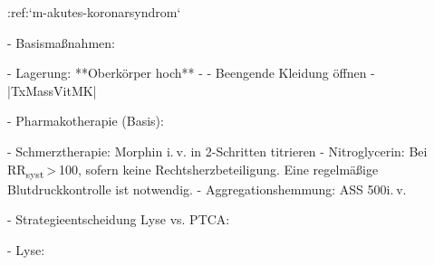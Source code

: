 
:ref:`m-akutes-koronarsyndrom`


\begin{itemize}
  -   Basismaßnahmen:
  \begin{itemize}
    -   Lagerung: **Oberkörper hoch**
    -   
    -   Beengende Kleidung öffnen
    -   |TxMassVitMK|
  \end{itemize}
  -   Pharmakotherapie (Basis):
  \begin{itemize}
  -   Schmerztherapie: Morphin i. v. in 2\Mg*-Schritten titrieren
  -   Nitroglycerin: Bei RR\textsubscript{syst} {\textgreater} 100\MmHg*, 
  sofern keine Rechtsherzbeteiligung.
  Eine regelmäßige Blutdruckkontrolle ist notwendig.
  -   Aggregationshemmung: ASS 500\Mg* i. v.
  \end{itemize}
  -   Strategieentscheidung Lyse vs. PTCA:
  \begin{itemize}
    -   Lyse:
  \end{itemize}
\end{itemize}


